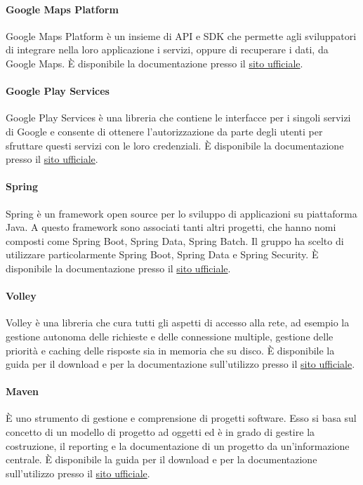 \paragraph{Google Maps Platform}\hbox{}
Google Maps Platform è un insieme di API e SDK che permette agli sviluppatori di integrare nella loro applicazione i servizi, oppure di recuperare i dati, da Google Maps.
È disponibile la documentazione presso il \href{https://cloud.google.com/maps-platform?hl=it}{sito ufficiale}.

\paragraph{Google Play Services}\hbox{}
Google Play Services è una libreria che contiene le interfacce per i singoli servizi di Google e consente di ottenere l'autorizzazione da parte degli utenti per sfruttare questi servizi con le loro credenziali.
È disponibile la documentazione presso il \href{https://developers.google.com/android/guides/overview}{sito ufficiale}.

\paragraph{Spring}\hbox{}
Spring è un framework open source per lo sviluppo di applicazioni su piattaforma Java.
A questo framework sono associati tanti altri progetti, che hanno nomi composti come Spring Boot, Spring Data, Spring Batch. Il gruppo ha scelto di utilizzare particolarmente Spring Boot, Spring Data e Spring Security.
È disponibile la documentazione presso il \href{https://spring.io/}{sito ufficiale}.

\paragraph{Volley}\hbox{}
Volley è una libreria che cura tutti gli aspetti di accesso alla rete, ad esempio la gestione autonoma delle richieste e delle connessione multiple, gestione delle priorità e caching delle risposte sia in memoria che su disco.
È disponibile la guida per il download e per la documentazione sull'utilizzo presso il \href{https://developer.android.com/training/volley}{sito ufficiale}.

\paragraph{Maven}\hbox{}
È uno strumento di gestione e comprensione di progetti software. Esso si basa sul concetto di un modello di progetto ad oggetti ed è in grado di gestire la costruzione, 
il reporting e la documentazione di un progetto da un'informazione centrale.
È disponibile la guida per il download e per la documentazione sull'utilizzo presso il \href{https://maven.apache.org/}{sito ufficiale}.

